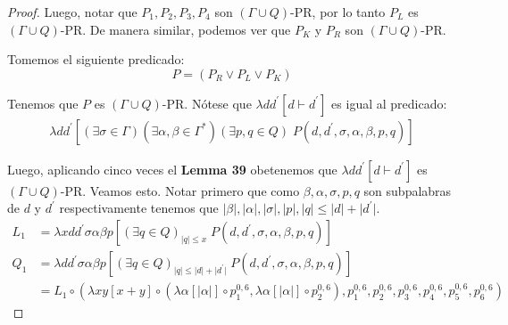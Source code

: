 \begin{proof}
    \PN Luego, notar que $P_1, P_2 , P_3, P_4 $ son $(\Gamma \cup Q)$-PR, por lo tanto $P_L$ es $(\Gamma \cup Q)$-PR. De
    manera similar, podemos ver que $P_K$ y $P_R$ son $(\Gamma \cup Q)$-PR.

    \PN Tomemos el siguiente predicado:
    \[
      P = (P_{R}\vee P_{L}\vee P_{K})
    \]

    \PN Tenemos que $P$ es $(\Gamma \cup Q)$-PR. Nótese que $\lambda dd^{\prime} \left[d\vdash d^{\prime}\right]$ es
    igual al predicado:
    \begin{eqnarray*}
      \lambda dd^{\prime}\left[(\exists \sigma \in \Gamma)(\exists \alpha,\beta \in \Gamma^{\ast})(\exists p,q \in Q)
      \; P(d,d^{\prime},\sigma,\alpha,\beta,p,q)\right]
    \end{eqnarray*}

    \PN Luego, aplicando cinco veces el \textbf{Lemma 39} obetenemos que $\lambda dd^{\prime} \left[d\vdash d^{\prime}
    \right]$ es $(\Gamma \cup Q)$-PR. Veamos esto. Notar primero que como $\beta, \alpha, \sigma, p, q$ son subpalabras
    de $d$ y $d^{\prime}$ respectivamente tenemos que $\lvert\beta\rvert, \lvert\alpha\rvert, \lvert\sigma\rvert, \lvert
    p \rvert, \lvert q \rvert \leq \lvert d \rvert + \lvert d^{\prime} \rvert$.
    \begin{align*}
      L_1 &= \lambda xdd^{\prime}\sigma\alpha\beta p \left[(\exists q \in Q)_{\lvert q \rvert \leq x} \; P(d,d^{\prime},
             \sigma,\alpha,\beta,p,q)\right] \\
      Q_1 &= \lambda dd^{\prime}\sigma\alpha\beta p \left[(\exists q \in Q)_{\lvert q \rvert \leq \lvert d \rvert +
             \lvert d^{\prime} \rvert} \; P(d,d^{\prime},\sigma,\alpha,\beta,p,q)\right] \\
          &= L_1 \circ (\lambda xy \left[x + y\right] \circ(\lambda \alpha \left[\lvert\alpha\rvert\right] \circ
             p_{1}^{0,6}, \lambda \alpha \left[\lvert\alpha\rvert\right] \circ p_{2}^{0,6}), p_{1}^{0,6}, p_{2}^{0,6},
             p_{3}^{0,6}, p_{4}^{0,6}, p_{5}^{0,6}, p_{6}^{0,6})
    \end{align*}


\end{proof}
